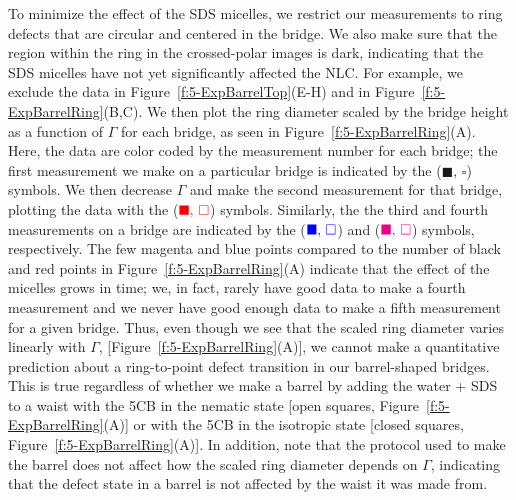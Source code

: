 To minimize the effect of the SDS micelles, we restrict our measurements to ring defects that are circular and centered in the bridge.
We also make sure that the region within the ring in the crossed-polar images is dark, indicating that the SDS micelles have not yet significantly affected the NLC.
For example, we exclude the data in Figure~\ref{f:5-ExpBarrelTop}(E-H) and in Figure~\ref{f:5-ExpBarrelRing}(B,C).
We then plot the ring diameter scaled by the bridge height as a function of $\Gamma$ for each bridge, as seen in Figure~\ref{f:5-ExpBarrelRing}(A).
Here, the data are color coded by the measurement number for each bridge; the first measurement we make on a particular bridge is indicated by the (${\blacksquare,\, \square}$) symbols.
We then decrease $\Gamma$ and make the second measurement for that bridge, plotting the data with the (${\color{red} \blacksquare,\, \square}$) symbols.
Similarly, the the third and fourth measurements on a bridge are indicated by the (${\color{blue} \blacksquare,\, \square}$) and (${\color{magenta} \blacksquare,\, \square}$) symbols, respectively.
The few magenta and blue points compared to the number of black and red points in Figure~\ref{f:5-ExpBarrelRing}(A) indicate that the effect of the micelles grows in time; we, in fact, rarely have good data to make a fourth measurement and we never have good enough data to make a fifth measurement for a given bridge.
Thus, even though we see that the scaled ring diameter varies linearly with $\Gamma$, [Figure~\ref{f:5-ExpBarrelRing}(A)], we cannot make a quantitative prediction about a ring-to-point defect transition in our barrel-shaped bridges.
This is true regardless of whether we make a barrel by adding the water + SDS to a waist with the 5CB in the nematic state [open squares, Figure~\ref{f:5-ExpBarrelRing}(A)] or with the 5CB in the isotropic state [closed squares, Figure~\ref{f:5-ExpBarrelRing}(A)].
In addition, note that the protocol used to make the barrel does not affect how the scaled ring diameter depends on $\Gamma$, indicating that the defect state in a barrel is not affected by the waist it was made from.

